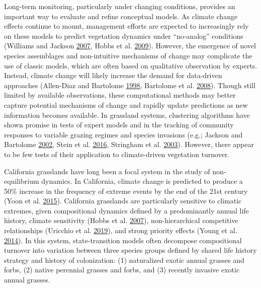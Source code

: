 \documentclass[twoside,12pt,final]{ucthesis-CA2012}
\begin{document}
\begin{ucmainmatter}
Long-term monitoring, particularly under changing conditions, provides an important way to evaluate and refine conceptual models.
As climate change effects continue to mount, management efforts are expected to increasingly rely on these models to predict vegetation dynamics under ``no-analog'' conditions (Williams and Jackson \protect\hyperlink{ref-Williams2007}{2007}, Hobbs et al. \protect\hyperlink{ref-Hobbs2009}{2009}).
However, the emergence of novel species assemblages and non-intuitive mechanisms of change may complicate the use of classic models, which are often based on qualitative observation by experts.
Instead, climate change will likely increase the demand for data-driven approaches (Allen-Diaz and Bartolome \protect\hyperlink{ref-Allen-Diaz1998}{1998}, Bartolome et al. \protect\hyperlink{ref-Bartolome2008}{2008}).
Though still limited by available observations, these computational methods may better capture potential mechanisms of change and rapidly update predictions as new information becomes available.
In grassland systems, clustering algorithms have shown promise in tests of expert models and in the tracking of community responses to variable grazing regimes and species invasions (e.g.; Jackson and Bartolome \protect\hyperlink{ref-Jackson2002}{2002}, Stein et al. \protect\hyperlink{ref-Stein2016}{2016}, Stringham et al. \protect\hyperlink{ref-Stringham2003}{2003}). However, there appear to be few tests of their application to climate-driven vegetation turnover.

California grasslands have long been a focal system in the study of non-equilibrium dynamics.
In California, climate change is predicted to produce a 50\% increase in the frequency of extreme events by the end of the 21st century (Yoon et al. \protect\hyperlink{ref-Yoon2015}{2015}).
California grasslands are particularly sensitive to climatic extremes, given compositional dynamics defined by a predominantly annual life history, climate sensitivity (Hobbs et al. \protect\hyperlink{ref-Hobbs2007}{2007}), non-hierarchical competitive relationships (Uricchio et al. \protect\hyperlink{ref-Uricchio2019}{2019}), and strong priority effects (Young et al. \protect\hyperlink{ref-Young2014}{2014}).
In this system, state-transition models often decompose compositional turnover into variation between three species groups defined by shared life history strategy and history of colonization: (1) naturalized exotic annual grasses and forbs, (2) native perennial grasses and forbs, and (3) recently invasive exotic annual grasses.


\end{ucmainmatter}
\end{document}
